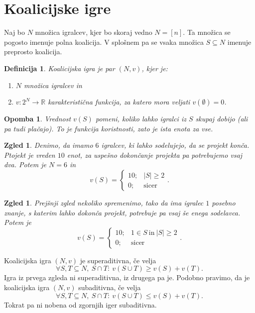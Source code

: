 \documentclass[10pt, a4paper]{article}
\newtheorem{defi}[izr]{Definicija}
\newenvironment{noticeB}{%
  \tcolorbox[%
  notitle,
  empty,
  enhanced,  %
  breakable,
  coltext=black,
  colback=white, 
  fontupper=\rmfamily,
  noparskip,
  sharp corners,
  boxrule=-1pt,  %
  frame hidden,
  left=7pt,  %
  right=7pt,
  top=5pt,
  bottom=5pt,
  before skip=2.5ex plus 2pt,
  after skip=2.5ex plus 2pt,
  borderline west = {1.5pt}{-0.1pt}{blue!30!black}, %
  overlay unbroken and last={%
    \draw[color=black, line width=1.25pt]
    ($(frame.south west)+(1.pt, -0.1pt)$) -- ++(2em, 0);
  }
  ]}
{\endtcolorbox}
\newenvironment{definicija}{\begin{noticeB}\begin{defi}}{%
    \end{defi}\end{noticeB}}
\newtheorem*{opomba}{Opomba}
\newtheorem{zgled}[izr]{Zgled}
\newcommand{\R}{\mathbb {R}}
\begin{document}
\section{Koalicijske igre}

Naj bo $N$ množica igralcev, kjer bo skoraj vedno $N = [n]$.
Ta množica se pogosto imenuje polna koalicija. V splošnem pa se vsaka množica $S \subseteq N$
imenuje preprosto koalicija.

\begin{definicija}
  Koalicijska igra je par $(N, v)$, kjer je:
  \begin{enumerate}
    \item $N$ množica igralcev in
    \item $v: 2^N \to \R$ karakteristična funkcija, za katero mora veljati $v(\emptyset) = 0$.
  \end{enumerate}
\end{definicija}

\begin{opomba}
  Vrednost $v(S)$ pomeni, koliko lahko igralci iz $S$ skupaj dobijo (ali pa tudi plačajo).
  To je funkcija koristnosti, zato je ista enota za vse.
\end{opomba}

\begin{zgled}
  Denimo, da imamo $6$ igralcev, ki lahko sodelujejo, da se projekt konča.
  Ptojekt je vreden $10$ enot, za uspešno dokončanje projekta pa potrebujemo vsaj dva.
  Potem je $N = 6$ in 
  $$v(S) = \begin{cases}
    10;& |S| \geq 2\\
    0;& \text{sicer}
  \end{cases}.$$
\end{zgled}

\begin{zgled}
  Prejšnji zgled nekoliko spremenimo, tako da ima igralec $1$ posebno znanje, s katerim lahko dokonča projekt,
  potrebuje pa vsaj še enega sodelavca. Potem je 
  $$v(S) = \begin{cases}
    10;& 1 \in S\ \text{in}\ |S| \geq 2\\
    0;& \text{sicer}
  \end{cases}.$$
\end{zgled}

Koalicijska igra $(N, v)$ je superaditivna, če velja 
$$\forall S, T \subseteq N,\ S \cap T:\ v(S \cup T) \geq v(S) + v(T).$$
Igra iz prvega zgleda ni superaditivna, iz drugega pa je.
Podobno pravimo, da je koalicijska igra $(N, v)$ subaditivna, če velja 
$$\forall S, T \subseteq N,\ S \cap T:\ v(S \cup T) \leq v(S) + v(T).$$
Tokrat pa ni nobena od zgornjih iger subaditivna.
\end{document}
